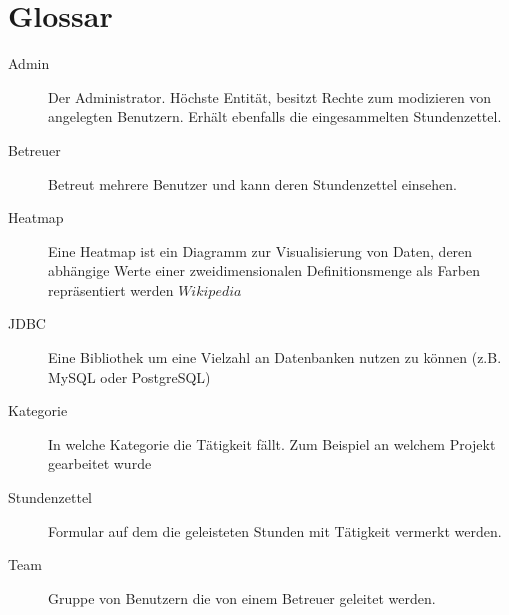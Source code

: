 \section{Glossar}
\begin{description}
	\item[Admin] Der Administrator. Höchste Entität, besitzt Rechte zum modizieren von angelegten Benutzern.
	               Erhält ebenfalls die eingesammelten Stundenzettel.

	\item[Betreuer] Betreut mehrere Benutzer und kann deren Stundenzettel einsehen.

	\item[Heatmap] Eine Heatmap ist ein Diagramm zur Visualisierung von Daten, deren abhängige Werte einer zweidimensionalen Definitionsmenge als Farben repräsentiert werden \(Wikipedia\)

	\item[JDBC] Eine Bibliothek um eine Vielzahl an Datenbanken nutzen zu können (z.B. MySQL oder PostgreSQL)

	\item[Kategorie] In welche Kategorie die Tätigkeit fällt. Zum Beispiel an welchem Projekt gearbeitet wurde

	\item[Stundenzettel] Formular auf dem die geleisteten Stunden mit Tätigkeit vermerkt werden.

	\item[Team] Gruppe von Benutzern die von einem Betreuer geleitet werden.

\end{description}
